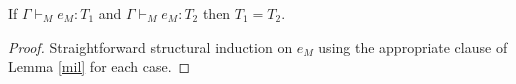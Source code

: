 \begin{muotl}
\label{muotl}
If $\Gamma\vdash_{M}e_{M}:T_{1}$ and $\Gamma\vdash_{M}e_{M}:T_{2}$ then $T_{1}=T_{2}$.
\begin{proof}
Straightforward structural induction on $e_{M}$ using the appropriate clause of Lemma \ref{mil} for each case.
\end{proof}
\end{muotl}